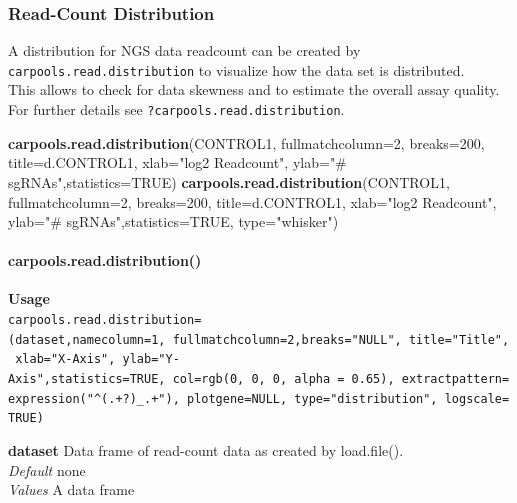 \documentclass[]{article}
\newenvironment{Shaded}{\begin{snugshade}}{\end{snugshade}}
\newcommand{\KeywordTok}[1]{\textcolor[rgb]{0.13,0.29,0.53}{\textbf{{#1}}}}
\newcommand{\DataTypeTok}[1]{\textcolor[rgb]{0.13,0.29,0.53}{{#1}}}
\newcommand{\DecValTok}[1]{\textcolor[rgb]{0.00,0.00,0.81}{{#1}}}
\newcommand{\StringTok}[1]{\textcolor[rgb]{0.31,0.60,0.02}{{#1}}}
\newcommand{\OtherTok}[1]{\textcolor[rgb]{0.56,0.35,0.01}{{#1}}}
\newcommand{\NormalTok}[1]{{#1}}
\let\oldparagraph\paragraph
\renewcommand{\paragraph}[1]{\oldparagraph{#1}\mbox{}}
\begin{document}
\subsubsection{Read-Count Distribution}\label{read-count-distribution}

A distribution for NGS data readcount can be created by
\texttt{carpools.read.distribution} to visualize how the data set is
distributed.\\
This allows to check for data skewness and to estimate the overall assay
quality.\\
For further details see \texttt{?carpools.read.distribution}.

\begin{Shaded}
\begin{Highlighting}[]
\KeywordTok{carpools.read.distribution}\NormalTok{(CONTROL1, }\DataTypeTok{fullmatchcolumn=}\DecValTok{2}\NormalTok{, }\DataTypeTok{breaks=}\DecValTok{200}\NormalTok{,}
  \DataTypeTok{title=}\NormalTok{d.CONTROL1, }\DataTypeTok{xlab=}\StringTok{"log2 Readcount"}\NormalTok{, }\DataTypeTok{ylab=}\StringTok{"# sgRNAs"}\NormalTok{,}\DataTypeTok{statistics=}\OtherTok{TRUE}\NormalTok{) }
\KeywordTok{carpools.read.distribution}\NormalTok{(CONTROL1, }\DataTypeTok{fullmatchcolumn=}\DecValTok{2}\NormalTok{, }\DataTypeTok{breaks=}\DecValTok{200}\NormalTok{,}
  \DataTypeTok{title=}\NormalTok{d.CONTROL1, }\DataTypeTok{xlab=}\StringTok{"log2 Readcount"}\NormalTok{, }\DataTypeTok{ylab=}\StringTok{"# sgRNAs"}\NormalTok{,}\DataTypeTok{statistics=}\OtherTok{TRUE}\NormalTok{, }\DataTypeTok{type=}\StringTok{"whisker"}\NormalTok{) }
\end{Highlighting}
\end{Shaded}

\paragraph{carpools.read.distribution()}\label{carpools.read.distribution}

\textbf{Usage}\\
\texttt{carpools.read.distribution=(dataset,namecolumn=1,\ fullmatchcolumn=2,breaks="NULL",\ title="Title",\ xlab="X-Axis",\ ylab="Y-Axis",statistics=TRUE,\ col=rgb(0,\ 0,\ 0,\ alpha\ =\ 0.65),\ extractpattern=expression("\^{}(.+?)\_.+"),\ plotgene=NULL,\ type="distribution",\ logscale=TRUE)}

\textbf{dataset} Data frame of read-count data as created by
load.file().\\
\emph{Default} none\\
\emph{Values} A data frame
\end{document}
